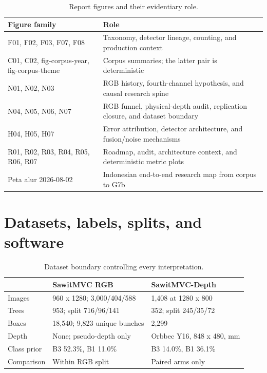 \begin{table}[t]
\centering
\caption{Report figures and their evidentiary role.}
\label{tab:figures}
\small
\begin{tabularx}{\textwidth}{L{0.34\textwidth}Y}
\toprule
Figure family & Role\\
\midrule
F01, F02, F03, F07, F08 & Taxonomy, detector lineage, counting, and production context\\
C01, C02, fig-corpus-year, fig-corpus-theme & Corpus summaries; the latter pair is deterministic\\
N01, N02, N03 & RGB history, fourth-channel hypothesis, and causal research spine\\
N04, N05, N06, N07 & RGB funnel, physical-depth audit, replication closure, and dataset boundary\\
H04, H05, H07 & Error attribution, detector architecture, and fusion/noise mechanisms\\
R01, R02, R03, R04, R05, R06, R07 & Roadmap, audit, architecture context, and deterministic metric plots\\
Peta alur 2026-08-02 & Indonesian end-to-end research map from corpus to G7b\\
\bottomrule
\end{tabularx}
\end{table}


\section{Datasets, labels, splits, and software}
\label{sec:datasets}
\begin{table}[H]
\centering
\caption{Dataset boundary controlling every interpretation.}
\begin{tabularx}{\columnwidth}{L{0.25\columnwidth}Y Y}
\toprule
 & \textbf{SawitMVC RGB} & \textbf{SawitMVC-Depth}\\
\midrule
Images & 960 x 1280; 3,000/404/588 & 1,408 at 1280 x 800\\
Trees & 953; split 716/96/141 & 352; split 245/35/72\\
Boxes & 18,540; 9,823 unique bunches & 2,299\\
Depth & None; pseudo-depth only & Orbbec Y16, 848 x 480, mm\\
Class prior & B3 52.3\%, B1 11.0\% & B3 14.0\%, B1 36.1\%\\
Comparison & Within RGB split & Paired arms only\\
\bottomrule
\end{tabularx}
\end{table}

